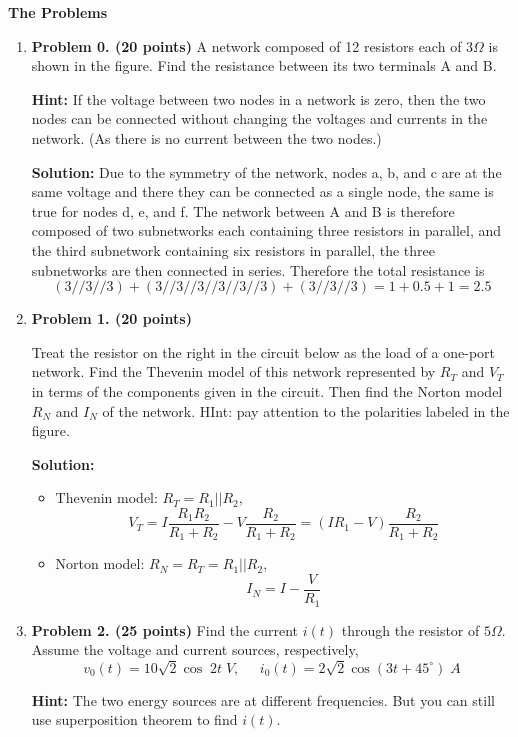 {\bf The Problems}
\begin{enumerate}

\item {\bf Problem 0. (20 points)} 
A network composed of 12 resistors each of $3\Omega$ is shown in the figure.
Find the resistance between its two terminals A and B. 

{\bf Hint:} If the voltage between two nodes in a network is zero, then the 
two nodes can be connected without changing the voltages and currents in the 
network. (As there is no current between the two nodes.)


{\bf Solution:} Due to the symmetry of the network, nodes a, b, and c are
at the same voltage and there they can be connected as a single node, the
same is true for nodes d, e, and f. The network between A and B is therefore
composed of two subnetworks each containing three resistors in parallel, 
and the third subnetwork containing six resistors in parallel, the three
subnetworks are then connected in series. Therefore the total resistance is
\[  (3//3//3) + (3//3//3//3//3//3)+ (3//3//3)=1+0.5+1=2.5 \]

\item {\bf Problem 1. (20 points)}

Treat the resistor on the right in the circuit below as the load of a
one-port network. Find the Thevenin model of this network represented
by $R_T$ and $V_T$ in terms of the components given in the circuit. 
Then find the Norton model $R_N$ and $I_N$ of the network. HInt: pay 
attention to the polarities labeled in the figure.


{\bf Solution:}
\begin{itemize}
\item Thevenin model: $R_T=R_1||R_2$, 
\[ V_T=I\frac{R_1 R_2}{R_1+R_2}-V\frac{R_2}{R_1+R_2}=(IR_1-V)\frac{R_2}{R_1+R_2} \]
\item Norton model: $R_N=R_T=R_1||R_2$, 
\[ I_N=I-\frac{V}{R_1} \]
\end{itemize}

\item {\bf Problem 2. (25 points)} 
Find the current $i(t)$ through the resistor of $5\Omega$. Assume the 
voltage and current sources, respectively, 
\[ v_0(t)=10\sqrt{2} \cos \; 2t\; V,\;\;\;\;\; 
   i_0(t)=2\sqrt{2} \cos(3t+45^\circ)\; A \]

{\bf Hint:} The two energy sources are at different frequencies. But
you can still use superposition theorem to find $i(t)$.


\end{enumerate}
